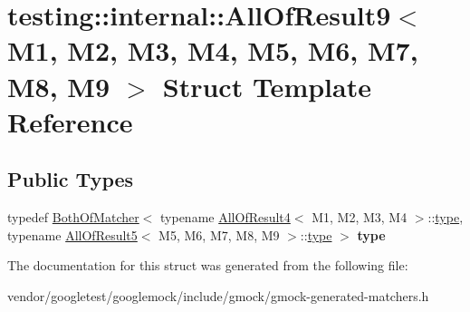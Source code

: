 \hypertarget{structtesting_1_1internal_1_1_all_of_result9}{}\section{testing\+:\+:internal\+:\+:All\+Of\+Result9$<$ M1, M2, M3, M4, M5, M6, M7, M8, M9 $>$ Struct Template Reference}
\label{structtesting_1_1internal_1_1_all_of_result9}
\subsection*{Public Types}
\begin{DoxyCompactItemize}
\item 
\mbox{\label{structtesting_1_1internal_1_1_all_of_result9_ade56e18d2e0b745968b87fc394710edc}} 
typedef \hyperlink{classtesting_1_1internal_1_1_both_of_matcher}{Both\+Of\+Matcher}$<$ typename \hyperlink{structtesting_1_1internal_1_1_all_of_result4}{All\+Of\+Result4}$<$ M1, M2, M3, M4 $>$\+::\hyperlink{classtesting_1_1internal_1_1_both_of_matcher}{type}, typename \hyperlink{structtesting_1_1internal_1_1_all_of_result5}{All\+Of\+Result5}$<$ M5, M6, M7, M8, M9 $>$\+::\hyperlink{classtesting_1_1internal_1_1_both_of_matcher}{type} $>$ {\bfseries type}
\end{DoxyCompactItemize}


The documentation for this struct was generated from the following file\+:\begin{DoxyCompactItemize}
\item 
vendor/googletest/googlemock/include/gmock/gmock-\/generated-\/matchers.\+h\end{DoxyCompactItemize}
